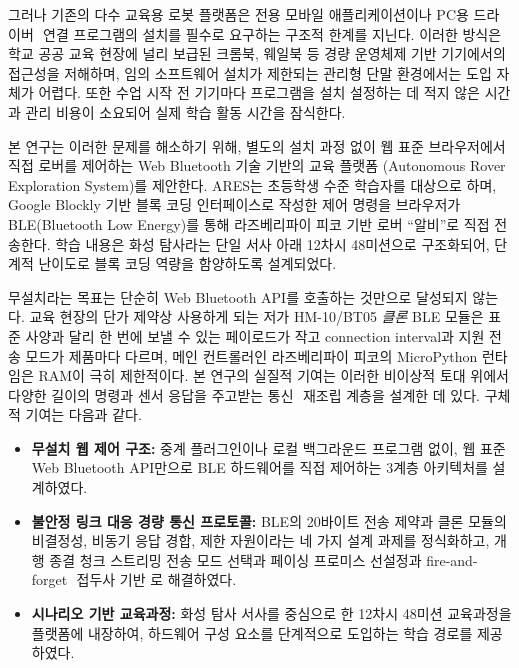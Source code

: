\documentclass[10pt]{article}
\begin{document}
그러나 기존의 다수 교육용 로봇 플랫폼은 전용 모바일 애플리케이션이나 PC용 드라이버
\,\textperiodcentered\,연결 프로그램의 설치를 필수로 요구하는 구조적 한계를 지닌다.
이러한 방식은 학교\,\textperiodcentered\,공공 교육 현장에 널리 보급된 크롬북,
웨일북 등 경량 운영체제 기반 기기에서의 접근성을 저해하며, 임의 소프트웨어 설치가
제한되는 관리형 단말 환경에서는 도입 자체가 어렵다. 또한 수업 시작 전 기기마다
프로그램을 설치\,\textperiodcentered\,설정하는 데 적지 않은 시간과 관리 비용이
소요되어 실제 학습 활동 시간을 잠식한다.

본 연구는 이러한  문제를 해소하기 위해, 별도의 설치 과정 없이
웹 표준 브라우저에서 직접 로버를 제어하는 Web Bluetooth 기술 기반의 교육 플랫폼
(Autonomous Rover Exploration System)를 제안한다. ARES는 초등학생
수준 학습자를 대상으로 하며, Google Blockly 기반 블록 코딩 인터페이스로 작성한
제어 명령을 브라우저가 BLE(Bluetooth Low Energy)를 통해 라즈베리파이 피코 기반
로버 ``알비''로 직접 전송한다. 학습 내용은 화성 탐사라는 단일 서사 아래 12차시
48미션으로 구조화되어, 단계적 난이도로 블록 코딩 역량을 함양하도록 설계되었다.

무설치라는 목표는 단순히 Web Bluetooth API를 호출하는 것만으로 달성되지 않는다.
교육 현장의 단가 제약상 사용하게 되는 저가 HM-10/BT05 \emph{클론} BLE 모듈은 표준
사양과 달리 한 번에 보낼 수 있는 페이로드가 작고 connection interval과 지원 전송
모드가 제품마다 다르며, 메인 컨트롤러인 라즈베리파이 피코의 MicroPython 런타임은
RAM이 극히 제한적이다. 본 연구의 실질적 기여는 이러한 비이상적 토대 위에서 다양한
길이의 명령과 센서 응답을  주고받는 통신\,\textperiodcentered\,
재조립 계층을 설계한 데 있다. 구체적 기여는 다음과 같다.

\begin{itemize}
  \item \textbf{무설치 웹 제어 구조:} 중계 플러그인이나 로컬 백그라운드 프로그램
        없이, 웹 표준 Web Bluetooth API만으로 BLE 하드웨어를 직접 제어하는
        3계층 아키텍처를 설계하였다.
  \item \textbf{불안정 링크 대응 경량 통신 프로토콜:} BLE의 20바이트 전송 제약과
        클론 모듈의 비결정성, 비동기 응답 경합, 제한 자원이라는 네 가지 설계
        과제를 정식화하고, 개행 종결 청크 스트리밍\,\textperiodcentered\,전송 모드
        선택과 페이싱\,\textperiodcentered\,프로미스 선설정과 fire-and-forget
        \,\textperiodcentered\,접두사 기반 로 해결하였다.
  \item \textbf{시나리오 기반 교육과정:} 화성 탐사 서사를 중심으로 한 12차시
        48미션 교육과정을 플랫폼에 내장하여, 하드웨어 구성 요소를 단계적으로
        도입하는 학습 경로를 제공하였다.
\end{itemize}
\end{document}
